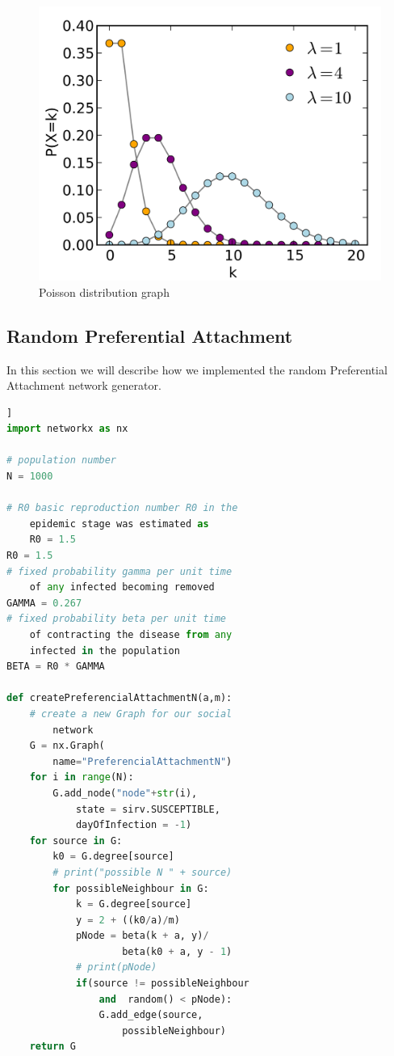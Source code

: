         \begin{figure}[t]
            \centering
            \includegraphics[width=\linewidth]{Figure/poissonDistribution.png}
            \caption{Poisson distribution graph}
            \label{fig:poissonDistribution}
        \end{figure}
        
    \subsection{Random Preferential Attachment}
        In this section we will describe how we implemented the random Preferential Attachment network generator.
        
        \begin{lstlisting}[language=Python, frame=single]]
import networkx as nx

# population number
N = 1000

# R0 basic reproduction number R0 in the 
    epidemic stage was estimated as 
    R0 = 1.5
R0 = 1.5
# fixed probability gamma per unit time 
    of any infected becoming removed
GAMMA = 0.267
# fixed probability beta per unit time 
    of contracting the disease from any
    infected in the population
BETA = R0 * GAMMA

def createPreferencialAttachmentN(a,m):
    # create a new Graph for our social
        network
    G = nx.Graph(
        name="PreferencialAttachmentN")
    for i in range(N):
        G.add_node("node"+str(i),
            state = sirv.SUSCEPTIBLE,
            dayOfInfection = -1)
    for source in G:
        k0 = G.degree[source]
        # print("possible N " + source)
        for possibleNeighbour in G:
            k = G.degree[source]
            y = 2 + ((k0/a)/m)
            pNode = beta(k + a, y)/
                    beta(k0 + a, y - 1)
            # print(pNode)
            if(source != possibleNeighbour
                and  random() < pNode):
                G.add_edge(source, 
                    possibleNeighbour)
    return G
        \end{lstlisting}
        
